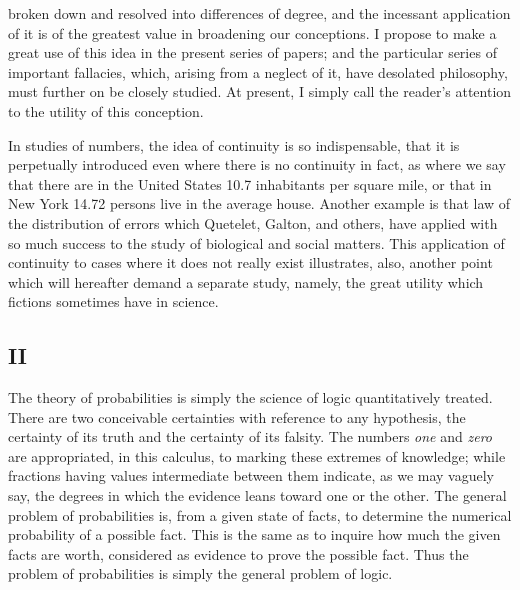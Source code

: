 broken down and resolved into differences of degree, and the incessant application of it is of the greatest value in broadening our conceptions. I propose to make a great use of this idea in the present series of papers; and the particular series of important fallacies, which, arising from a neglect of it, have desolated philosophy, must further on be closely studied. At present, I simply call the reader's attention to the utility of this conception.

In studies of numbers, the idea of continuity is so indispensable, that it is perpetually introduced even where there is no continuity in fact, as where we say that there are in the United States 10.7 inhabitants per square mile, or that in New York 14.72 persons live in the average house. Another example is that law of the distribution of errors which Quetelet, Galton, and others, have applied with so much success to the study of biological and social matters. This application of continuity to cases where it does not really exist illustrates, also, another point which will hereafter demand a separate study, namely, the great utility which fictions sometimes have in science.

\subsection*{II}

The theory of probabilities is simply the science of logic quantitatively treated. There are two conceivable certainties with reference to any hypothesis, the certainty of its truth and the certainty of its falsity. The numbers \emph{one} and \emph{zero} are appropriated, in this calculus, to marking these extremes of knowledge; while fractions having values intermediate between them indicate, as we may vaguely say, the degrees in which the evidence leans toward one or the other. The general problem of probabilities is, from a given state of facts, to determine the numerical probability of a possible fact. This is the same as to inquire how much the given facts are worth, considered as evidence to prove the possible fact. Thus the problem of probabilities is simply the general problem of logic.


